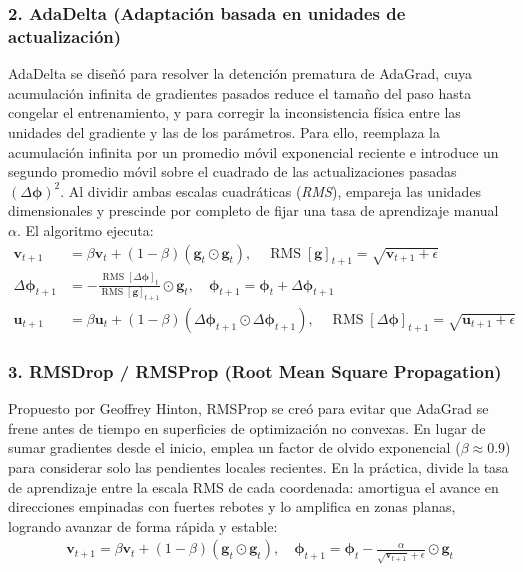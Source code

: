 \documentclass[10pt,a4paper]{article}
\begin{document}
{\subsubsection*{2. AdaDelta (Adaptación basada en unidades de actualización)}
AdaDelta se diseñó para resolver la detención prematura de AdaGrad, cuya acumulación infinita de gradientes pasados reduce el tamaño del paso hasta congelar el entrenamiento, y para corregir la inconsistencia física entre las unidades del gradiente y las de los parámetros. Para ello, reemplaza la acumulación infinita por un promedio móvil exponencial reciente e introduce un segundo promedio móvil sobre el cuadrado de las actualizaciones pasadas $(\Delta \boldsymbol{\phi})^2$. Al dividir ambas escalas cuadráticas (\textit{RMS}), empareja las unidades dimensionales y prescinde por completo de fijar una tasa de aprendizaje manual $\alpha$. El algoritmo ejecuta:
\begin{align*}
\mathbf{v}_{t+1} &= \beta \mathbf{v}_t + (1 - \beta) (\mathbf{g}_t \odot \mathbf{g}_t), \quad \operatorname{RMS}[\mathbf{g}]_{t+1} = \sqrt{\mathbf{v}_{t+1} + \epsilon} \\[0.01cm]
\Delta \boldsymbol{\phi}_{t+1} &= - \frac{\operatorname{RMS}[\Delta \boldsymbol{\phi}]_t}{\operatorname{RMS}[\mathbf{g}]_{t+1}} \odot \mathbf{g}_t, \quad \boldsymbol{\phi}_{t+1} = \boldsymbol{\phi}_t + \Delta \boldsymbol{\phi}_{t+1} \\[0.01cm]
\mathbf{u}_{t+1} &= \beta \mathbf{u}_t + (1 - \beta) (\Delta \boldsymbol{\phi}_{t+1} \odot \Delta \boldsymbol{\phi}_{t+1}), \quad \operatorname{RMS}[\Delta \boldsymbol{\phi}]_{t+1} = \sqrt{\mathbf{u}_{t+1} + \epsilon}
\end{align*}

\subsubsection*{3. RMSDrop / RMSProp (Root Mean Square Propagation)}
Propuesto por Geoffrey Hinton, RMSProp se creó para evitar que AdaGrad se frene antes de tiempo en superficies de optimización no convexas. En lugar de sumar gradientes desde el inicio, emplea un factor de olvido exponencial ($\beta \approx 0.9$) para considerar solo las pendientes locales recientes. En la práctica, divide la tasa de aprendizaje entre la escala RMS de cada coordenada: amortigua el avance en direcciones empinadas con fuertes rebotes y lo amplifica en zonas planas, logrando avanzar de forma rápida y estable:
\begin{align*}
\mathbf{v}_{t+1} = \beta \mathbf{v}_t + (1 - \beta) (\mathbf{g}_t \odot \mathbf{g}_t), \quad \boldsymbol{\phi}_{t+1} = \boldsymbol{\phi}_t - \frac{\alpha}{\sqrt{\mathbf{v}_{t+1}} + \epsilon} \odot \mathbf{g}_t
\end{align*}

}
\end{document}
